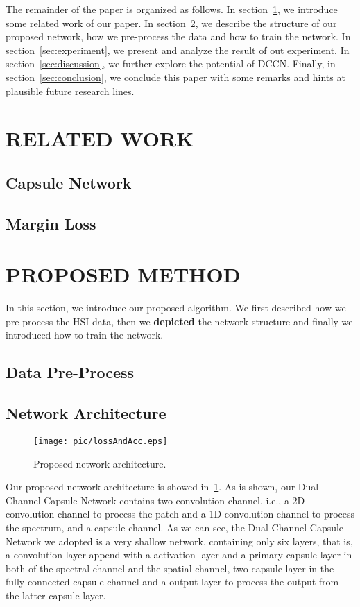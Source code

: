 \documentclass{article}
\begin{document}
	The remainder of the paper is organized as follows.
	In section~\ref{sec:related-works}, we introduce some related work of our paper.
	In section~\ref{sec:proposed-method}, we describe the structure of our proposed network, how we pre-process the data
	and how to train the network.
	In section~\ref{sec:experiment}, we present and analyze the result of out experiment.
	In section~\ref{sec:discussion}, we further explore the potential of DCCN\@.
	Finally, in section~\ref{sec:conclusion}, we conclude this paper with some remarks and hints at plausible future
	research lines.


	\section{RELATED WORK}\label{sec:related-works}

	\subsection{Capsule Network}\label{subsec:capsule-network}

	\subsection{Margin Loss}\label{subsec:margin-loss}


	\section{PROPOSED METHOD}\label{sec:proposed-method}

	In this section, we introduce our proposed algorithm.
	We first described how we pre-process the HSI data, then we \textbf{depicted} the network structure and finally we
	introduced how to train the network.

	\subsection{Data Pre-Process}\label{subsec:data-pre-process}

	\subsection{Network Architecture}\label{subsec:network-architecture}
	\begin{figure}[!ht]
		\centering
		\texttt{[image: pic/lossAndAcc.eps]}
		\caption{Proposed network architecture.}
		\label{netArct}
	\end{figure}
	Our proposed network architecture is showed in~\ref{netArct}.
	As is shown, our Dual-Channel Capsule Network contains two convolution channel, i.e., a 2D convolution channel to
	process the patch and a 1D convolution channel to process the spectrum, and a capsule channel.
	As we can see, the Dual-Channel Capsule Network we adopted is a very shallow network, containing only six layers,
	that is, a convolution layer append with a activation layer and a primary capsule layer in both of the spectral
	channel and the spatial channel, two capsule layer in the fully connected capsule channel and a output layer to
	process the output from the latter capsule layer.
\end{document}
